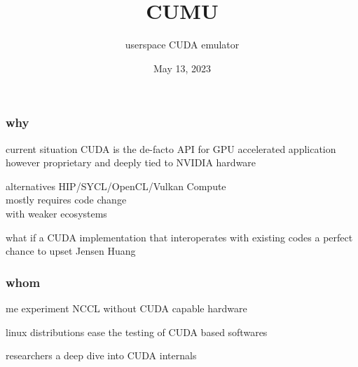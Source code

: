 \documentclass{beamer}
\title{CUMU}
\subtitle{userspace CUDA emulator}
\date{May 13, 2023}
\begin{document}
\begin{frame}
  \titlepage
\end{frame}

\begin{frame}
  \frametitle{why}
  \begin{alertblock}{current situation}
    CUDA is the de-facto API for GPU accelerated application \\
    however proprietary and deeply tied to NVIDIA hardware
  \end{alertblock}
  \begin{block}{alternatives}
    HIP/SYCL/OpenCL/Vulkan Compute \\
    mostly requires code change \\
    with weaker ecosystems
  \end{block}
  \begin{exampleblock}{what if}
    a CUDA implementation that interoperates with existing codes
    a perfect chance to upset Jensen Huang
  \end{exampleblock}
\end{frame}

\begin{frame}
  \frametitle{whom}
  \begin{block}{me}
    experiment NCCL without CUDA capable hardware
  \end{block}
  \begin{block}{linux distributions}
    ease the testing of CUDA based softwares
  \end{block}
  \begin{block}{researchers}
    a deep dive into CUDA internals
  \end{block}
\end{frame}
\end{document}

